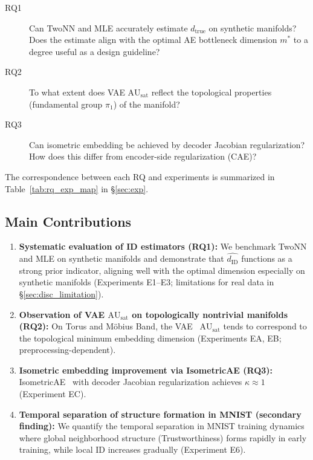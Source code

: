 \documentclass[12pt,a4paper]{article}
\newcommand{\dID}{d_{\mathrm{ID}}}
\newcommand{\dzopt}{m^*}
\newcommand{\dtrue}{d_{\mathrm{true}}}
\newcommand{\kap}{\kappa}
\newcommand{\AUsat}{\mathrm{AU}_{\mathrm{sat}}}
\begin{document}
\begin{description}
  \item[RQ1] Can TwoNN and MLE accurately estimate $\dtrue$ on synthetic manifolds?
             Does the estimate align with the optimal AE bottleneck dimension $\dzopt$
             to a degree useful as a design guideline?
  \item[RQ2] To what extent does VAE $\AUsat$ reflect the topological properties
             (fundamental group $\pi_1$) of the manifold?
  \item[RQ3] Can isometric embedding be achieved by decoder Jacobian regularization?
             How does this differ from encoder-side regularization (CAE)?
\end{description}

The correspondence between each RQ and experiments is summarized in Table~\ref{tab:rq_exp_map} in \S\ref{sec:exp}.

\subsection{Main Contributions}\label{sec:intro_contrib}

\begin{enumerate}
  \item \textbf{Systematic evaluation of ID estimators (RQ1):}
        We benchmark TwoNN and MLE on synthetic manifolds and demonstrate that $\hat{\dID}$
        functions as a strong prior indicator, aligning well with the optimal dimension especially on synthetic manifolds
        (Experiments E1--E3; limitations for real data in \S\ref{sec:disc_limitation}).
  \item \textbf{Observation of VAE $\AUsat$ on topologically nontrivial manifolds (RQ2):}
        On Torus and M\"{o}bius Band, the VAE~\cite{kingma2014vae} $\AUsat$
        tends to correspond to the topological minimum embedding dimension
        (Experiments EA, EB; preprocessing-dependent).
  \item \textbf{Isometric embedding improvement via IsometricAE (RQ3):}
        IsometricAE~\cite{kato2020rdae,nazari2023geometric} with decoder Jacobian regularization
        achieves $\kap \approx 1$ (Experiment EC).
  \item \textbf{Temporal separation of structure formation in MNIST (secondary finding):}
        We quantify the temporal separation in MNIST training dynamics
        where global neighborhood structure (Trustworthiness) forms rapidly in early training,
        while local ID increases gradually (Experiment E6).
\end{enumerate}
\end{document}
